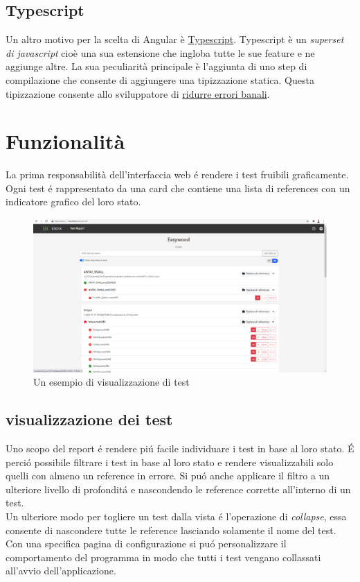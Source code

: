         \subsection{Typescript}
            Un altro motivo per la scelta di Angular è \href{https://www.typescriptlang.org}{Typescript}.
            Typescript è un \textit{superset di javascript} cioè una sua estensione che ingloba tutte le sue feature e ne aggiunge altre.
            La sua peculiarità principale è l'aggiunta di uno step di compilazione che consente di aggiungere una tipizzazione statica.
            Questa tipizzazione consente allo sviluppatore di
            \href{https://www.quora.com/Why-is-type-checking-important-in-programming-languages-and-how-should-one-choose-between-dynamically-and-statically-typed-languages}{ridurre errori banali}.
    \section{Funzionalità}
        La prima responsabilità dell'interfaccia web \'e rendere i test fruibili graficamente.
        Ogni test \'e rappresentato da una card che contiene una lista di references con un indicatore grafico del loro stato.
        \begin{figure}
            \includegraphics[width=\textwidth]{images/page.png}
            \caption{Un esempio di visualizzazione di test}
        \end{figure}
        \subsection{visualizzazione dei test}        
            Uno scopo del report \'e rendere pi\'u facile individuare i test in base al loro stato.
            \'E perci\'o possibile filtrare i test in base al loro stato e rendere visualizzabili solo quelli con almeno un reference in errore.
            Si pu\'o anche applicare il filtro a un ulteriore livello di profondit\'a e nascondendo le reference corrette all'interno di un test.
            \\
            Un ulteriore modo per togliere un test dalla vista \'e l'operazione di \textit{collapse}, essa consente di nascondere tutte le reference lasciando solamente il nome del test.
            Con una specifica pagina di configurazione si pu\'o personalizzare il comportamento del programma in modo che tutti i test vengano collassati all'avvio dell'applicazione.
            
